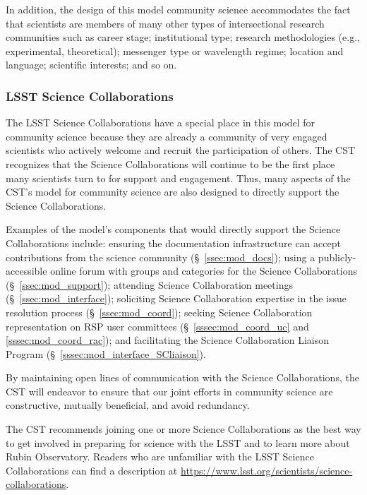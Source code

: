 \documentclass[DM,authoryear,toc]{lsstdoc}
\begin{document}
In addition, the design of this model community science accommodates the fact that scientists are members of many other types of intersectional research communities such as career stage; institutional type; research methodologies (e.g., experimental, theoretical); messenger type or wavelength regime; location and language; scientific interests; and so on.


\subsubsection{LSST Science Collaborations}\label{sssec:intro_comms_scicoll}

The LSST Science Collaborations have a special place in this model for community science because they are already a community of very engaged scientists who actively welcome and recruit the participation of others.
The CST recognizes that the Science Collaborations will continue to be the first place many scientists turn to for support and engagement.
Thus, many aspects of the CST's model for community science are also designed to directly support the Science Collaborations.

Examples of the model's components that would directly support the Science Collaborations include: ensuring the documentation infrastructure can accept contributions from the science community (\S~\ref{ssec:mod_docs}); using a publicly-accessible online forum with groups and categories for the Science Collaborations (\S~\ref{ssec:mod_support}); attending Science Collaboration meetings (\S~\ref{ssec:mod_interface}); soliciting Science Collaboration expertise in the issue resolution process (\S~\ref{ssec:mod_coord}); seeking Science Collaboration representation on RSP user committees (\S~\ref{sssec:mod_coord_uc} and \ref{sssec:mod_coord_rac}); and facilitating the Science Collaboration Liaison Program (\S~\ref{sssec:mod_interface_SCliaison}).

By maintaining open lines of communication with the Science Collaborations, the CST will endeavor to ensure that our joint efforts in community science are constructive, mutually beneficial, and avoid redundancy.

The CST recommends joining one or more Science Collaborations as the best way to get involved in preparing for science with the LSST and to learn more about Rubin Observatory.
Readers who are unfamiliar with the LSST Science Collaborations can find a description at \url{https://www.lsst.org/scientists/science-collaborations}.
\end{document}

